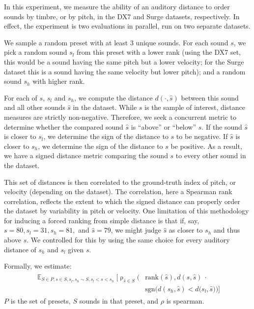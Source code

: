 In this experiment, we measure the ability of an auditory distance to order sounds by timbre, or by pitch, in the DX7 and Surge datasets, respectively. In effect, the experiment is two evaluations in parallel, run on two separate datasets.

We sample a random preset with at least 3 unique sounds. For each sound $s$, we pick a random sound $s_l$ from this preset with a lower rank (using the DX7 set, this would be a sound having the same pitch but a lower velocity; for the Surge dataset this is a sound having the same velocity but lower pitch); and a random sound $s_h$ with higher rank. %

For each of $s$, $s_l$ and $s_h$, we compute the distance $d(\cdot, \hat{s})$ between this sound and all other sounds $\hat{s}$ in the dataset. While $s$ is the sample of interest, distance measures are strictly non-negative. Therefore, we seek a concurrent metric to determine whether the compared sound $\hat{s}$ is ``above'' or ``below'' $s$. If the sound $\hat{s}$ is closer to $s_l$, we determine the sign of the distance to $s$ to be negative. If $\hat{s}$ is closer to $s_h$, we determine the sign of the distance to $s$ be positive. As a result, we have a signed distance metric comparing the sound $s$ to every other sound in the dataset.

This set of distances is then correlated to the ground-truth index of pitch, or velocity (depending on the dataset). The correlation, here a Spearman rank correlation, reflects the extent to which the signed distance can properly order the dataset by variability in pitch or velocity. 
One limitation of this methodology for inducing a forced ranking from simple distance is that if, say, $s = 80, s_l = 31, s_h = 81,$ and $\hat{s} = 79$, we might judge $\hat{s}$ as closer to $s_h$ and thus above $s$. We controlled for this by using the same choice for every auditory distance of $s_h$ and $s_l$ given $s$.

Formally, we estimate:
\begin{align}
\begin{split}
\mathop{\mathbb{E}}_{S \in P, s \in S, s_l, s_h \sim S, s_l < s < s_h} \bigg [ \mathop{\rho}_{\hat{s} \in S}\Big (& \textrm{rank}(\hat{s}), d(s, \hat{s}) \ \cdot \\
& \textrm{sgn} \big (d(s_h, \hat{s}) < d(s_l, \hat{s} \big ) \Big) \bigg ]
\end{split}
\end{align}
$P$ is the set of presets, $S$ sounds in that preset, and $\rho$ is spearman.

